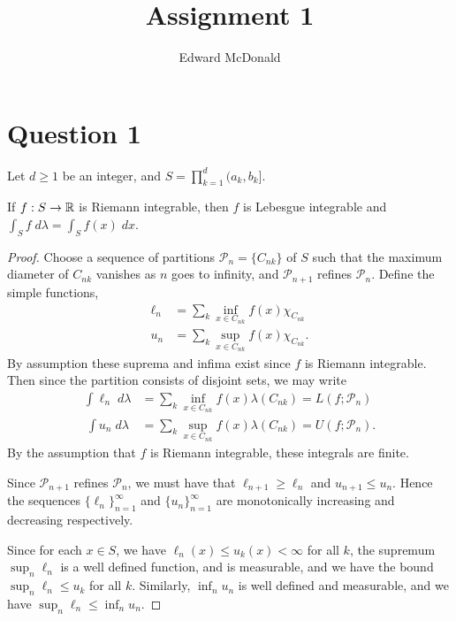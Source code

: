 \documentclass{unswmaths}
\begin{document}
\subject{Measure Theory}
\author{Edward McDonald}
\title{Assignment 1}


\setlength\parindent{0pt}


\newcommand{\Bor}{\mathcal{B}(\Rl)}
\newcommand{\sdiff}{\bigtriangleup}

\unswtitle{}


\section*{Question 1}
Let $d \geq 1$ be an integer, and $S = \prod_{k=1}^d (a_k,b_k]$.
\begin{theorem}
    If $f:S\rightarrow \mathbb{R}$ is Riemann integrable, then $f$ is Lebesgue integrable
    and $\int_S f\;d\lambda = \int_S f(x)\;dx$.
\end{theorem}
\begin{proof}
    Choose a sequence of partitions $\mathcal{P}_n = \{C_{nk}\}$
    of $S$ such that the maximum diameter of $C_{nk}$ vanishes as $n$ goes to infinity,
    and $\mathcal{P}_{n+1}$ refines $\mathcal{P}_n$.
    Define the simple functions,
    \begin{align*}
        \ell_n &= \sum_{k} \inf_{x \in C_{nk}}f(x)\chi_{C_{nk}}\\
        u_n &= \sum_{k} \sup_{x \in C_{nk}}f(x)\chi_{C_{nk}}.
    \end{align*}
    By assumption these suprema and infima exist since $f$ is Riemann integrable.
    Then since the partition consists of disjoint sets, we may write
    \begin{align*}
        \int \ell_n\;d\lambda &= \sum_{k} \inf_{x \in C_{nk}} f(x)\lambda(C_{nk}) = L(f;\mathcal{P}_n)\\\
        \int u_n\;d\lambda &= \sum_k \sup_{x \in C_{nk}}f(x) \lambda(C_{nk}) = U(f;\mathcal{P}_n).
    \end{align*}
    By the assumption that $f$ is Riemann integrable, these integrals are finite.
    
    Since $\mathcal{P}_{n+1}$ refines $\mathcal{P}_n$, we must have that $\ell_{n+1}\geq \ell_n$
    and $u_{n+1}\leq u_n$. Hence the sequences $\{\ell_n\}_{n=1}^\infty$ and $\{u_n\}_{n=1}^\infty$
    are monotonically increasing and decreasing respectively.
    
    Since for each $x \in S$, we have $\ell_n(x) \leq u_k(x) < \infty$ for all $k$, the supremum $\sup_n \ell_n$
    is a well defined function, and is measurable, and we have the bound $\sup_n \ell_n \leq u_k$ for all $k$.
    Similarly, $\inf_n u_n$ is well defined and measurable, and we have $\sup_n \ell_n \leq \inf_n u_n$.
    

\end{proof}
\end{document}
